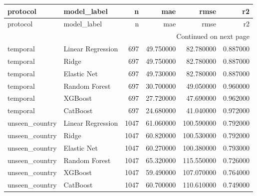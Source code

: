 \begin{longtable}{llrrrr}
\toprule
protocol & model\_label & n & mae & rmse & r2 \\
\midrule
\endfirsthead
\toprule
protocol & model\_label & n & mae & rmse & r2 \\
\midrule
\endhead
\midrule
\multicolumn{6}{r}{Continued on next page} \\
\midrule
\endfoot
\bottomrule
\endlastfoot
temporal & Linear Regression & 697 & 49.750000 & 82.780000 & 0.887000 \\
temporal & Ridge & 697 & 49.750000 & 82.780000 & 0.887000 \\
temporal & Elastic Net & 697 & 49.730000 & 82.780000 & 0.887000 \\
temporal & Random Forest & 697 & 30.700000 & 49.050000 & 0.960000 \\
temporal & XGBoost & 697 & 27.720000 & 47.690000 & 0.962000 \\
temporal & CatBoost & 697 & 24.680000 & 41.040000 & 0.972000 \\
unseen\_country & Linear Regression & 1047 & 61.060000 & 100.590000 & 0.792000 \\
unseen\_country & Ridge & 1047 & 60.820000 & 100.530000 & 0.792000 \\
unseen\_country & Elastic Net & 1047 & 60.270000 & 100.380000 & 0.793000 \\
unseen\_country & Random Forest & 1047 & 65.320000 & 115.550000 & 0.726000 \\
unseen\_country & XGBoost & 1047 & 59.490000 & 107.070000 & 0.764000 \\
unseen\_country & CatBoost & 1047 & 60.700000 & 110.610000 & 0.749000 \\
\end{longtable}
